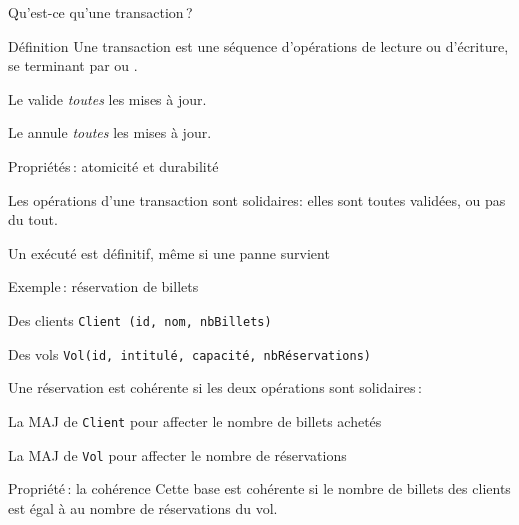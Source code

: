 

\begin{frame}{Qu'est-ce qu'une transaction\,?}

\begin{defblock}{Définition}
Une transaction est une séquence d'opérations de \alert{lecture} ou d'\alert{écriture}, 
se terminant par  ou .
\end{defblock}

\vfill

\begin{redbullet}
  \item Le   \alert{valide} \textit{toutes} les mises à jour.
  \item Le  \alert{annule} \textit{toutes} les mises à jour.
\end{redbullet}
\vfill

\begin{block}{\alert{Propriétés}\,: atomicité et durabilité}
\begin{redbullet}
  \item Les opérations d'une transaction sont solidaires: elles sont toutes validées, ou pas du tout.
   \item Un  exécuté  est \alert{définitif}, même si une panne survient
\end{redbullet}
\end{block}
\end{frame}

\begin{frame}{Exemple\,: réservation de billets}

\begin{redbullet}

  \item Des clients \texttt{Client (id, nom, nbBillets)}
  \item Des vols \texttt{Vol(id, intitulé, capacité, nbRéservations)} 
\end{redbullet}

\vfill

Une réservation est cohérente si les deux opérations sont \alert{solidaires}\,:

\begin{redbullet}

  \item La MAJ de  \texttt{Client} pour affecter le nombre de billets achetés
  \item La MAJ de \texttt{Vol} pour affecter le nombre de réservations
\end{redbullet}

\vfill
\begin{block}{\alert{Propriété}\,: la cohérence}
Cette base est \alert{cohérente} si le nombre de billets des clients
est égal à au nombre de réservations du vol.
\end{block}
\end{frame}


